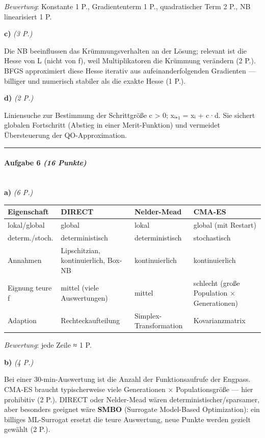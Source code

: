 \documentclass[11pt, a4paper]{article}
\begin{document}
\textit{Bewertung}: Konstante 1 P., Gradiententerm 1 P., quadratischer Term 2 P., NB linearisiert 1 P.


\textbf{c)} \textit{(3 P.)}

Die NB beeinflussen das Krümmungsverhalten an der Lösung; relevant ist die Hesse von L (nicht von f), weil Multiplikatoren die Krümmung verändern (2 P.). BFGS approximiert diese Hesse iterativ aus aufeinanderfolgenden Gradienten — billiger und numerisch stabiler als die exakte Hesse (1 P.).


\textbf{d)} \textit{(2 P.)}

Liniensuche zur Bestimmung der Schrittgröße c > 0; x⃗ᵢ₊₁ = x⃗ᵢ + c·d⃗. Sie sichert globalen Fortschritt (Abstieg in einer Merit-Funktion) und vermeidet Übersteuerung der QO-Approximation.



\noindent\textcolor{rulegray}{\rule{\linewidth}{0.4pt}}


\paragraph{Aufgabe 6 \textit{(16 Punkte)}}\mbox{}\\[2pt]

\textbf{a)} \textit{(6 P.)}



{\small
\begin{tabularx}{\linewidth}{XXXX}
\hline
\rowcolor{tableheadbg}
{\color{white}\textbf{Eigenschaft}} & {\color{white}\textbf{DIRECT}} & {\color{white}\textbf{Nelder-Mead}} & {\color{white}\textbf{CMA-ES}} \\[2pt]
\hline
\endhead
\hline
\endfoot
lokal/global & global & lokal & global (mit Restart) \\
determ./stoch. & deterministisch & deterministisch & stochastisch \\
Annahmen & Lipschitzian, kontinuierlich, Box-NB & kontinuierlich & kontinuierlich \\
Eignung teure f & mittel (viele Auswertungen) & mittel & schlecht (große Population × Generationen) \\
Adaption & Rechteckaufteilung & Simplex-Transformation & Kovarianzmatrix \\
\end{tabularx}
}


\textit{Bewertung}: jede Zeile ≈ 1 P.


\textbf{b)} \textit{(4 P.)}

Bei einer 30-min-Auswertung ist die Anzahl der Funktionsaufrufe der Engpass. CMA-ES braucht typischerweise viele Generationen × Populationsgröße — hier prohibitiv (2 P.). DIRECT oder Nelder-Mead wären deterministischer/sparsamer, aber besonders geeignet wäre \textbf{SMBO} (Surrogate Model-Based Optimization): ein billiges ML-Surrogat ersetzt die teure Auswertung, neue Punkte werden gezielt gewählt (2 P.).
\end{document}
